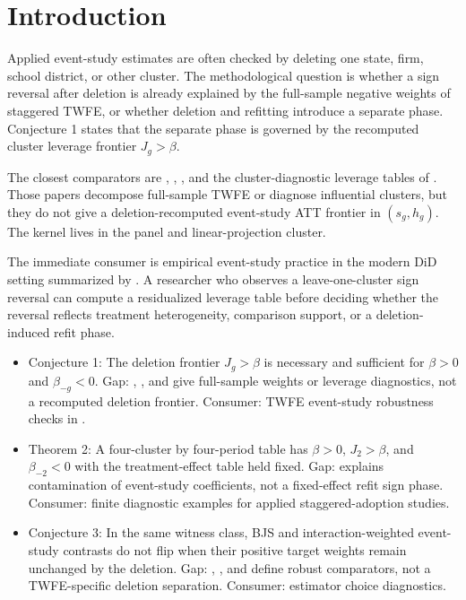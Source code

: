 \documentclass[11pt]{article}
\theoremstyle{definition}
\theoremstyle{plain}
\theoremstyle{remark}
\begin{document}
\section{Introduction}
Applied event-study estimates are often checked by deleting one state, firm, school district, or other cluster. The methodological question is whether a sign reversal after deletion is already explained by the full-sample negative weights of staggered TWFE, or whether deletion and refitting introduce a separate phase. Conjecture 1 states that the separate phase is governed by the recomputed cluster leverage frontier $J_g>\beta$.

The closest comparators are \citet[Section 3]{GoodmanBacon2021}, \citet[Theorem 1]{DeChaisemartinDHaultfoeuille2020}, \citet[Section 3]{SunAbraham2021}, and the cluster-diagnostic leverage tables of \citet[Sections 2--3]{MacKinnonNielsenWebb2023}. Those papers decompose full-sample TWFE or diagnose influential clusters, but they do not give a deletion-recomputed event-study ATT frontier in $(s_g,h_g)$. The kernel lives in the panel and linear-projection cluster.

The immediate consumer is empirical event-study practice in the modern DiD setting summarized by \citet{RothSantAnnaBilinskiPoe2023}. A researcher who observes a leave-one-cluster sign reversal can compute a residualized leverage table before deciding whether the reversal reflects treatment heterogeneity, comparison support, or a deletion-induced refit phase.

\begin{itemize}[leftmargin=*]
\item Conjecture 1: The deletion frontier $J_g>\beta$ is necessary and sufficient for $\beta>0$ and $\beta_{-g}<0$. Gap: \citet{GoodmanBacon2021}, \citet{DeChaisemartinDHaultfoeuille2020}, and \citet{MacKinnonNielsenWebb2023} give full-sample weights or leverage diagnostics, not a recomputed deletion frontier. Consumer: TWFE event-study robustness checks in \citet{RothSantAnnaBilinskiPoe2023}.
\item Theorem 2: A four-cluster by four-period table has $\beta>0$, $J_2>\beta$, and $\beta_{-2}<0$ with the treatment-effect table held fixed. Gap: \citet{SunAbraham2021} explains contamination of event-study coefficients, not a fixed-effect refit sign phase. Consumer: finite diagnostic examples for applied staggered-adoption studies.
\item Conjecture 3: In the same witness class, BJS and interaction-weighted event-study contrasts do not flip when their positive target weights remain unchanged by the deletion. Gap: \citet{BorusyakJaravelSpiess2024}, \citet{CallawaySantAnna2021}, and \citet{SunAbraham2021} define robust comparators, not a TWFE-specific deletion separation. Consumer: estimator choice diagnostics.
\end{itemize}
\end{document}
